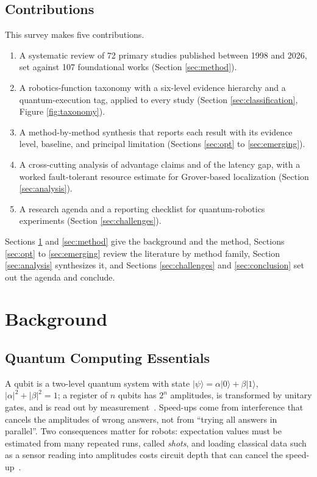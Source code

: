 \documentclass[acmsmall,screen,review]{acmart}
\begin{document}
\subsection{Contributions}\label{sec:contrib}
This survey makes five contributions.
\begin{enumerate}
  \item A systematic review of 72 primary studies published between 1998 and 2026, set against 107 foundational works (Section \ref{sec:method}).
  \item A robotics-function taxonomy with a six-level evidence hierarchy and a quantum-execution tag, applied to every study (Section \ref{sec:classification}, Figure \ref{fig:taxonomy}).
  \item A method-by-method synthesis that reports each result with its evidence level, baseline, and principal limitation (Sections \ref{sec:opt} to \ref{sec:emerging}).
  \item A cross-cutting analysis of advantage claims and of the latency gap, with a worked fault-tolerant resource estimate for Grover-based localization (Section \ref{sec:analysis}).
  \item A research agenda and a reporting checklist for quantum-robotics experiments (Section \ref{sec:challenges}).
\end{enumerate}
Sections \ref{sec:background} and \ref{sec:method} give the background and the method, Sections \ref{sec:opt} to \ref{sec:emerging} review the literature by method family, Section \ref{sec:analysis} synthesizes it, and Sections \ref{sec:challenges} and \ref{sec:conclusion} set out the agenda and conclude.

\section{Background}\label{sec:background}

\subsection{Quantum Computing Essentials}\label{sec:qc}
A qubit is a two-level quantum system with state $|\psi\rangle=\alpha|0\rangle+\beta|1\rangle$, $|\alpha|^2+|\beta|^2=1$; a register of $n$ qubits has $2^n$ amplitudes, is transformed by unitary gates, and is read out by measurement~\cite{Nielsen2010}. Speed-ups come from interference that cancels the amplitudes of wrong answers, not from ``trying all answers in parallel''. Two consequences matter for robots: expectation values must be estimated from many repeated runs, called \emph{shots}, and loading classical data such as a sensor reading into amplitudes costs circuit depth that can cancel the speed-up~\cite{Aaronson2015}.
\end{document}
